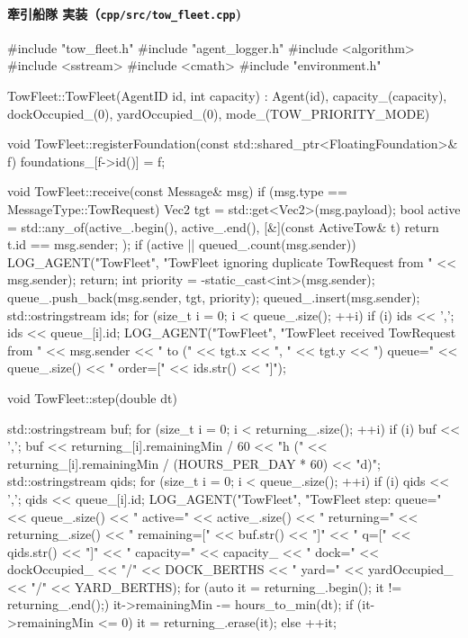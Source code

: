 \documentclass[10pt,letterpaper]{jsarticle}
\begin{document}
\paragraph{牽引船隊 実装（\texttt{cpp/src/tow\_fleet.cpp})}
\begin{cppcode}
#include "tow_fleet.h"
#include "agent_logger.h"
#include <algorithm>
#include <sstream>
#include <cmath>
#include "environment.h"

TowFleet::TowFleet(AgentID id, int capacity)
    : Agent(id), capacity_(capacity), dockOccupied_(0), yardOccupied_(0),
      mode_(TOW_PRIORITY_MODE) {}

void TowFleet::registerFoundation(const std::shared_ptr<FloatingFoundation>& f) {
    foundations_[f->id()] = f;
}

void TowFleet::receive(const Message& msg) {
    if (msg.type == MessageType::TowRequest) {
        Vec2 tgt = std::get<Vec2>(msg.payload);
        bool active = std::any_of(active_.begin(), active_.end(), [&](const ActiveTow& t) {
            return t.id == msg.sender;
        });
        if (active || queued_.count(msg.sender)) {
            LOG_AGENT("TowFleet", "TowFleet ignoring duplicate TowRequest from " << msg.sender);
            return;
        }
        int priority = -static_cast<int>(msg.sender);
        queue_.push_back({msg.sender, tgt, priority});
        queued_.insert(msg.sender);
        std::ostringstream ids;
        for (size_t i = 0; i < queue_.size(); ++i) {
            if (i) ids << ',';
            ids << queue_[i].id;
        }
        LOG_AGENT("TowFleet", "TowFleet received TowRequest from " << msg.sender
                  << " to (" << tgt.x << ", " << tgt.y << ") queue="
                  << queue_.size() << " order=[" << ids.str() << "]");
    }
}

void TowFleet::step(double dt) {
    std::ostringstream buf;
    for (size_t i = 0; i < returning_.size(); ++i) {
        if (i) buf << ',';
        buf << returning_[i].remainingMin / 60 << "h (" << returning_[i].remainingMin / (HOURS_PER_DAY * 60) << "d)";
    }
    std::ostringstream qids;
    for (size_t i = 0; i < queue_.size(); ++i) {
        if (i) qids << ',';
        qids << queue_[i].id;
    }
    LOG_AGENT("TowFleet", "TowFleet step: queue=" << queue_.size()
              << " active=" << active_.size()
              << " returning=" << returning_.size()
              << " remaining=[" << buf.str() << "]"
              << " q=[" << qids.str() << "]"
              << " capacity=" << capacity_
              << " dock=" << dockOccupied_ << "/" << DOCK_BERTHS
              << " yard=" << yardOccupied_ << "/" << YARD_BERTHS);
    for (auto it = returning_.begin(); it != returning_.end();) {
        it->remainingMin -= hours_to_min(dt);
        if (it->remainingMin <= 0) {
            it = returning_.erase(it);
        } else {
            ++it;
        }
    }

}
\end{cppcode}
\end{document}
